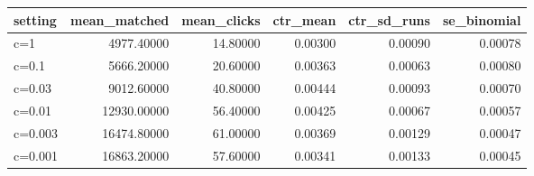 \begin{tabular}{lrrrrr}
\toprule
setting & mean\_matched & mean\_clicks & ctr\_mean & ctr\_sd\_runs & se\_binomial \\
\midrule
c=1 & 4977.40000 & 14.80000 & 0.00300 & 0.00090 & 0.00078 \\
c=0.1 & 5666.20000 & 20.60000 & 0.00363 & 0.00063 & 0.00080 \\
c=0.03 & 9012.60000 & 40.80000 & 0.00444 & 0.00093 & 0.00070 \\
c=0.01 & 12930.00000 & 56.40000 & 0.00425 & 0.00067 & 0.00057 \\
c=0.003 & 16474.80000 & 61.00000 & 0.00369 & 0.00129 & 0.00047 \\
c=0.001 & 16863.20000 & 57.60000 & 0.00341 & 0.00133 & 0.00045 \\
\bottomrule
\end{tabular}

